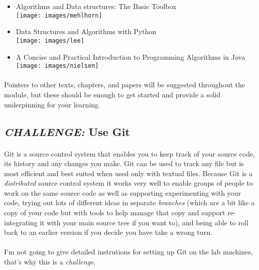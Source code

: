 \documentclass[10pt, a4paper, twosize]{article}
\begin{document}
\begin{itemize}
\item Algorithms and Data structures: The Basic Toolbox\\
\texttt{[image: images/mehlhorn]}

\item Data Structures and Algorithms with Python\\
\texttt{[image: images/lee]}

\item A Concise and Practical Introduction to Programming Algorithms in Java\\
\texttt{[image: images/nielsen]}

\end{itemize}

\paragraph{} Pointers to other texts, chapters, and papers will be suggested throughout the module, but these should be enough to get started and provide a solid underpinning for your learning.

\subsection{\emph{CHALLENGE:} Use Git}
\paragraph{} Git is a source control system that enables you to keep track of your source code, its history and any changes you make. Git can be used to track any file but is most efficient and best suited when used only with textual files. Because Git is a \emph{distributed} source control system it works very well to enable groups of people to work on the same source code as well as supporting experimenting with your code, trying out lots of different ideas in separate \emph{branches} (which are a bit like a copy of your code but with tools to help manage that copy and support re-integrating it with your main source tree if you want to), and being able to roll back to an earlier version if you decide you have take a wrong turn.

\paragraph{} I'm not going to give detailed instrutions for setting up Git on the lab machines, that's why this is a \emph{challenge}.
\end{document}
